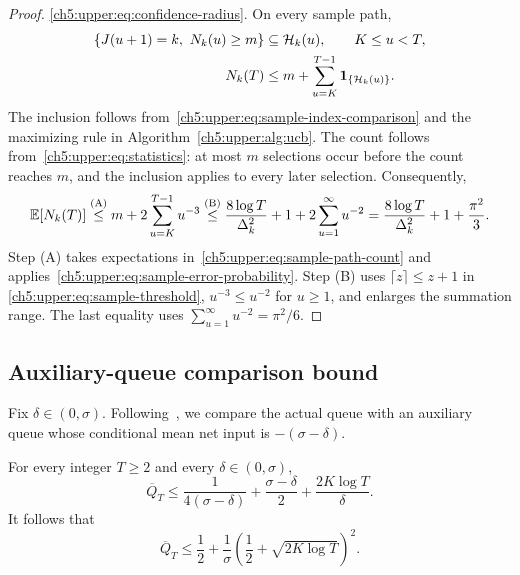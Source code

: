 \begin{proof}
\eqref{ch5:upper:eq:confidence-radius}.
On every sample path,
\begin{equation}
\begin{aligned}
 \{J(u+1)=k,\ N_k(u)\ge m\}&\subseteq\mathcal H_k(u),
 \qquad K\le u<T,\\
 N_k(T)&\le m+\sum_{u=K}^{T-1}\mathbf{1}_{\{\mathcal H_k(u)\}}.
\end{aligned}
\label{ch5:upper:eq:sample-path-count}
\end{equation}
The inclusion follows from~\eqref{ch5:upper:eq:sample-index-comparison}
and the maximizing rule in Algorithm~\ref{ch5:upper:alg:ucb}.
The count follows from~\eqref{ch5:upper:eq:statistics}: at most $m$
selections occur before the count reaches $m$, and the inclusion
applies to every later selection. Consequently,
\begin{equation*}
\mathbb{E}[N_k(T)]
\overset{\text{(A)}}{\le}m+2\sum_{u=K}^{T-1}u^{-3}
\overset{\text{(B)}}{\le}\frac{8\log T}{\Delta_k^2}+1
  +2\sum_{u=1}^{\infty}u^{-2}
=\frac{8\log T}{\Delta_k^2}+1+\frac{\pi^2}{3}.
\end{equation*}
Step (A) takes expectations in~\eqref{ch5:upper:eq:sample-path-count}
and applies~\eqref{ch5:upper:eq:sample-error-probability}. Step (B) uses
$\lceil z\rceil\le z+1$ in \eqref{ch5:upper:eq:sample-threshold},
$u^{-3}\le u^{-2}$ for $u\ge1$, and enlarges the summation range.
The last equality uses $\sum_{u=1}^{\infty}u^{-2}=\pi^2/6$.
\end{proof}

\subsection{Auxiliary-queue comparison bound}
\label{ch5:upper:sec:stage-one}

Fix $\delta\in(0,\sigma)$. Following~\cite{Freund2023}, we compare the
actual queue with an auxiliary queue whose conditional mean net input
is $-(\sigma-\delta)$.

\begin{Thm:Lemma}
\label{ch5:upper:lem:stage-one}
For every integer $T\ge2$ and every $\delta\in(0,\sigma)$,
\begin{equation}
 \overline Q_T
 \le\frac{1}{4(\sigma-\delta)}+\frac{\sigma-\delta}{2}
 +\frac{2K\log T}{\delta}.
 \label{ch5:upper:eq:stage-one}
\end{equation}
It follows that
\begin{equation}
 \overline Q_T
 \le\frac12+\frac1\sigma
 \left(\frac12+\sqrt{2K\log T}\right)^2.
 \label{ch5:upper:eq:stage-one-simple}
\end{equation}
\end{Thm:Lemma}

